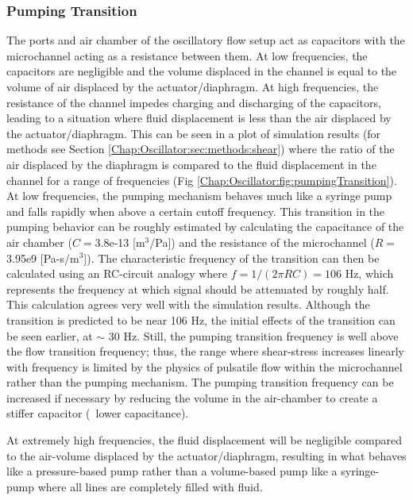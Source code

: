 \subsubsection{Pumping Transition}
The ports and air chamber of the oscillatory flow setup act as capacitors with the microchannel acting as a resistance between them. At low frequencies, the capacitors are negligible and the volume displaced in the channel is equal to the volume of air displaced by the actuator\slash diaphragm. At high frequencies, the resistance of the channel impedes charging and discharging of the capacitors, leading to a situation where fluid displacement is less than the air displaced by the actuator\slash diaphragm. This can be seen in a plot of simulation results (for methods see Section \ref{Chap:Oscillator:sec:methods:shear}) where the ratio of the air displaced by the diaphragm is compared to the fluid displacement in the channel for a range of frequencies (Fig \ref{Chap:Oscillator:fig:pumpingTransition}). At low frequencies, the pumping mechanism behaves much like a syringe pump and falls rapidly when above a certain cutoff frequency. This transition in the pumping behavior can be roughly estimated by calculating the capacitance of the air chamber ($C = $3.8e-13 [m$^{3}$/Pa]) and the resistance of the microchannel ($R = $3.95e9 [Pa-s/m$^{3}$]). The characteristic frequency of the transition can then be calculated using an RC-circuit analogy where $f = 1/(2\pi RC) = 106$ Hz, which represents the frequency at which signal should be attenuated by roughly half. This calculation agrees very well with the simulation results. Although the transition is predicted to be near 106 Hz, the initial effects of the transition can be seen earlier, at $\sim$ 30 Hz. Still, the pumping transition frequency is well above the flow transition frequency; thus, the range where shear-stress increases linearly with frequency is limited by the physics of pulsatile flow within the microchannel rather than the pumping mechanism. The pumping transition frequency can be increased if necessary by reducing the volume in the air-chamber to create a stiffer capacitor (\ie\, lower capacitance).

At extremely high frequencies, the fluid displacement will be negligible compared to the air-volume displaced by the actuator\slash diaphragm, resulting in what behaves like a pressure-based pump rather than a volume-based pump like a syringe-pump where all lines are completely filled with fluid.

